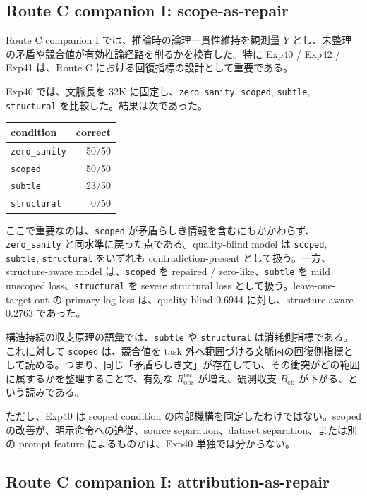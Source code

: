 \documentclass[12pt,a4paper]{article}
\begin{document}
\subsection{Route C companion I: scope-as-repair}\label{route-c-companion-i-scope-as-repair}

Route C companion I では、推論時の論理一貫性維持を観測量 \(Y\) とし、未整理の矛盾や競合値が有効推論経路を削るかを検査した。特に Exp40 / Exp42 / Exp41 は、Route C における回復指標の設計として重要である。

Exp40 では、文脈長を 32K に固定し、\texttt{zero\_sanity}, \texttt{scoped}, \texttt{subtle}, \texttt{structural} を比較した。結果は次であった。

{\def\LTcaptype{table} %
\begin{longtable}[]{@{}lr@{}}
\toprule\noalign{}
condition & correct \\
\midrule\noalign{}
\endhead
\bottomrule\noalign{}
\endlastfoot
\texttt{zero\_sanity} & 50/50 \\
\texttt{scoped} & 50/50 \\
\texttt{subtle} & 23/50 \\
\texttt{structural} & 0/50 \\
\end{longtable}
}

ここで重要なのは、\texttt{scoped} が矛盾らしき情報を含むにもかかわらず、\texttt{zero\_sanity} と同水準に戻った点である。quality-blind model は \texttt{scoped}, \texttt{subtle}, \texttt{structural} をいずれも contradiction-present として扱う。一方、structure-aware model は、\texttt{scoped} を repaired / zero-like、\texttt{subtle} を mild unscoped loss、\texttt{structural} を severe structural loss として扱う。leave-one-target-out の primary log loss は、quality-blind 0.6944 に対し、structure-aware 0.2763 であった。

構造持続の収支原理の語彙では、\texttt{subtle} や \texttt{structural} は消耗側指標である。これに対して \texttt{scoped} は、競合値を task 外へ範囲づける文脈内の回復側指標として読める。つまり、同じ「矛盾らしき文」が存在しても、その衝突がどの範囲に属するかを整理することで、有効な \(R_{\mathrm{obs}}^{\mathrm{rec}}\) が増え、観測収支 \(B_{\mathrm{eff}}\) が下がる、という読みである。

ただし、Exp40 は scoped condition の内部機構を同定したわけではない。scoped の改善が、明示命令への追従、source separation、dataset separation、または別の prompt feature によるものかは、Exp40 単独では分からない。

\subsection{Route C companion I: attribution-as-repair}\label{route-c-companion-i-attribution-as-repair}
\end{document}
